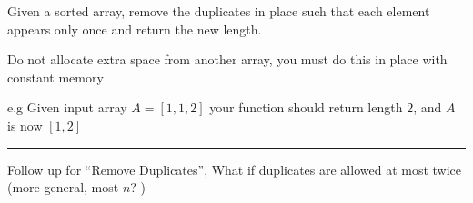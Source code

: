 Given a sorted array, remove the duplicates in place such that each element appears only once and return the new length.

Do not allocate extra space from another array, you must do this in place with constant memory

e.g
Given input array $A=[1,1,2]$
your function should return length $2$, and $A$ is now $[1,2]$



\vskip 2cm
\hrule
\vskip 2cm
Follow up for ``Remove Duplicates'', What if duplicates are allowed at most twice (more general, most $n$? )


\bye